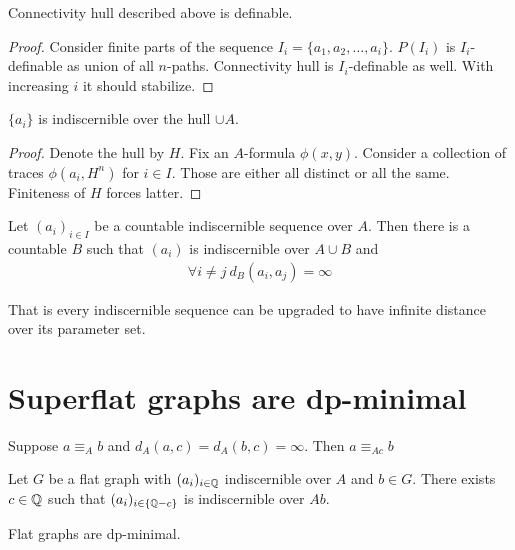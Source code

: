 \documentclass{amsart}
\begin{document}
\begin{Lemma}
	Connectivity hull described above is definable.
\end{Lemma}

\begin{proof}
	Consider finite parts of the sequence $I_i = \{a_1, a_2, \ldots, a_i\}$. $P(I_i)$ is $I_i$-definable as union of all $n$-paths. Connectivity hull is $I_i$-definable as well. With increasing $i$ it should stabilize.
\end{proof}

\begin{Lemma}
	$\{a_i\}$ is indiscernible over the hull $\cup A$.
\end{Lemma}

\begin{proof}
	Denote the hull by $H$. Fix an $A$-formula $\phi(x,y)$. Consider a collection of traces $\phi(a_i, H^n)$ for $i \in I$. Those are either all distinct or all the same. Finiteness of $H$ forces latter.
\end{proof}

\begin{Corollary}
	Let $(a_i)_{i \in I}$ be a countable indiscernible sequence over $A$. Then there is a countable $B$ such that  $(a_i)$ is indiscernible over $A \cup B$ and
	\begin{align*}
		\forall i \neq j \ d_B(a_i, a_j) = \infty
	\end{align*}
\end{Corollary}

That is every indiscernible sequence can be upgraded to have infinite distance over its parameter set.

\section{Superflat graphs are dp-minimal}

\begin{Lemma}
	Suppose $a \equiv_A b$ and $d_A(a, c) = d_A(b, c) = \infty$. Then $a \equiv_{Ac} b$
\end{Lemma}

\begin{Theorem}
	Let $G$ be a flat graph with $(a_i)_{i\in\mathbb{Q}}$ indiscernible over $A$ and $b \in G$. There exists $c \in \mathbb{Q}$ such that $(a_i)_{i\in\{\mathbb{Q} - c\}}$ is indiscernible over $Ab$.
\end{Theorem}

\begin{Corollary}
	Flat graphs are dp-minimal.
\end{Corollary}
\end{document}

